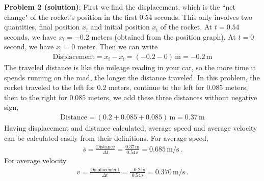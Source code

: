 \documentclass[11pt]{article}
\begin{document}
\textbf{Problem 2 (solution)}: First we find the displacement, which is the ``net change" of the rocket's position in the first 0.54 seconds. This only involves two quantities, final position $x_\text{f}$ and initial position $x_{\text{i}}$ of the rocket. At $t=0.54$ seconds, we have $x_\text{f} = -0.2$ meters (obtained from the position graph). At $t = 0$ second, we have $x_\text{i} = 0$ meter. Then we can write
\begin{align*}
\text{Displacement} = x_\text{f} - x_\text{i} = (-0.2 - 0) \,\text{m} = -0.2 \,\text{m}
\end{align*} 
The traveled distance is like the mileage reading in your car, so the more time it spends running on the road, the longer the distance traveled. In this problem, the rocket traveled to the left for $0.2$ meters, continue to the left for $0.085$ meters, then to the right for $0.085$ meters, we add these three distances without negative sign, 
\begin{align*}
\text{Distance} = (0.2 + 0.085 + 0.085) \, \text{m}= 0.37 \, \text{m}
\end{align*}
Having displacement and distance calculated, average speed and average velocity can be calculated easily from their definitions. For average speed, 
\begin{align*}
\overline{s} = \frac{\text{Distance}}{\Delta t} = \frac{0.37\,\text{m}}{0.54\,\text{s}}= 0.685\,\text{m/s}\,.
\end{align*}
For average velocity
\begin{align*}
\overline{v} = \frac{\text{Displacement}}{\Delta t} = \frac{-0.2\,\text{m}}{0.54\,\text{s}} = 0.370\,\text{m/s}\,.
\end{align*}
\end{document}
